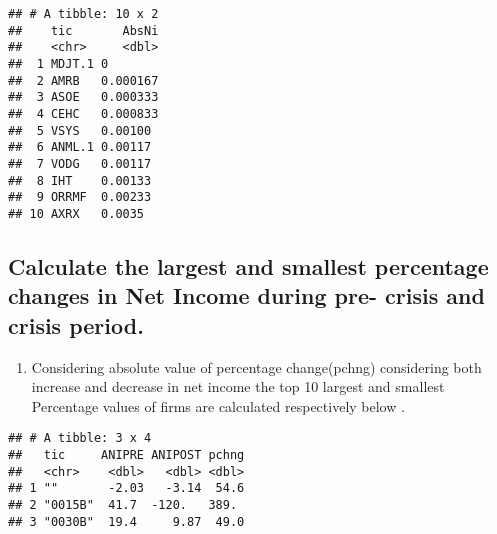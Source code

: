 \documentclass[
]{article}
\newenvironment{Shaded}{\begin{snugshade}}{\end{snugshade}}
\newcommand{\AttributeTok}[1]{\textcolor[rgb]{0.77,0.63,0.00}{#1}}
\newcommand{\DecValTok}[1]{\textcolor[rgb]{0.00,0.00,0.81}{#1}}
\newcommand{\FunctionTok}[1]{\textcolor[rgb]{0.00,0.00,0.00}{#1}}
\newcommand{\NormalTok}[1]{#1}
\newcommand{\OtherTok}[1]{\textcolor[rgb]{0.56,0.35,0.01}{#1}}
\newcommand{\SpecialCharTok}[1]{\textcolor[rgb]{0.00,0.00,0.00}{#1}}
\newcommand{\StringTok}[1]{\textcolor[rgb]{0.31,0.60,0.02}{#1}}
\providecommand{\tightlist}{%
  \setlength{\itemsep}{0pt}\setlength{\parskip}{0pt}}
\begin{document}
\begin{verbatim}
## # A tibble: 10 x 2
##    tic       AbsNi
##    <chr>     <dbl>
##  1 MDJT.1 0       
##  2 AMRB   0.000167
##  3 ASOE   0.000333
##  4 CEHC   0.000833
##  5 VSYS   0.00100 
##  6 ANML.1 0.00117 
##  7 VODG   0.00117 
##  8 IHT    0.00133 
##  9 ORRMF  0.00233 
## 10 AXRX   0.0035
\end{verbatim}

\hypertarget{calculate-the-largest-and-smallest-percentage-changes-in-net-income-during-pre--crisis-and-crisis-period.}{%
\subsection{Calculate the largest and smallest percentage changes in Net
Income during pre- crisis and crisis
period.}\label{calculate-the-largest-and-smallest-percentage-changes-in-net-income-during-pre--crisis-and-crisis-period.}}

\begin{enumerate}
\def\labelenumi{\alph{enumi})}
\tightlist
\item
  Considering absolute value of percentage change(pchng) considering
  both increase and decrease in net income the top 10 largest and
  smallest Percentage values of firms are calculated respectively below
  .
\end{enumerate}

\begin{Shaded}
\end{Shaded}

\begin{verbatim}
## # A tibble: 3 x 4
##   tic     ANIPRE ANIPOST pchng
##   <chr>    <dbl>   <dbl> <dbl>
## 1 ""       -2.03   -3.14  54.6
## 2 "0015B"  41.7  -120.   389. 
## 3 "0030B"  19.4     9.87  49.0
\end{verbatim}
\end{document}

